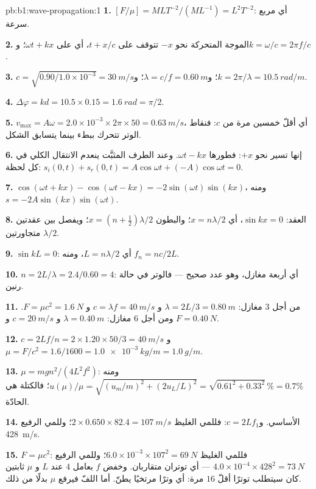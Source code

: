 \begin{solution}{pb:b1:wave-propagation:1}
\textbf{1.} $[F/\mu] = M L T^{-2}/(M L^{-1}) = L^2 T^{-2}$: أي مربع
سرعة.

\textbf{2.} الموجة المتحركة نحو $-x$ تتوقف على $t + x/c$، أي على
$\omega t + kx$؛ و$k = \omega/c = 2\pi f/c$.

\textbf{3.} $c = \sqrt{0.90/1.0\times10^{-3}} = \qty{30}{m/s}$؛
و$\lambda = c/f = \qty{0.60}{m}$؛ و$k = 2\pi/\lambda = \qty{10.5}{rad/m}$.

\textbf{4.} $\Delta\varphi = kd = 10.5 \times 0.15 = \qty{1.6}{rad} = \pi/2$.

\textbf{5.} $v_{\max} = A\omega = 2.0\times10^{-3} \times 2\pi \times 50 =
\qty{0.63}{m/s}$، أي أقلّ خمسين مرة من $c$: فنقاط الوتر تتحرك
ببطء بينما يتسابق الشكل.

\textbf{6.} إنها تسير نحو $+x$: فطورها $\omega t - kx$. وعند الطرف
المثبَّت ينعدم الانتقال الكلي في كل لحظة: $s_i(0, t) + s_r(0, t)
= A\cos\omega t + (-A)\cos\omega t = 0$.

\textbf{7.} $\cos(\omega t + kx) - \cos(\omega t - kx) =
-2\sin(\omega t)\sin(kx)$، ومنه $s = -2A\sin(kx)\sin(\omega t)$.

\textbf{8.} العقد: $\sin kx = 0$، أي $x = n\lambda/2$؛ والبطون $x = (n +
\tfrac12)\lambda/2$؛ ويفصل بين عقدتين متجاورتين $\lambda/2$.

\textbf{9.} $\sin kL = 0$: أي $L = n\lambda/2$، ومنه $f_n = nc/2L$.

\textbf{10.} $n = 2L/\lambda = 2.4/0.60 = 4$: أي أربعة مغازل، وهو عدد صحيح
--- فالوتر في حالة رنين.

\textbf{11.} من أجل $3$ مغازل: $\lambda = 2L/3 = \qty{0.80}{m}$ و $c = \lambda f
= \qty{40}{m/s}$ و $F = \mu c^2 = \qty{1.6}{N}$. ومن أجل $6$ مغازل: $\lambda =
\qty{0.40}{m}$ و $c = \qty{20}{m/s}$ و $F = \qty{0.40}{N}$.

\textbf{12.} $c = 2Lf/n = 2 \times 1.20 \times 50/3 = \qty{40}{m/s}$ و
$\mu = F/c^2 = 1.6/1600 = \qty{1.0e-3}{kg/m} = \qty{1.0}{g/m}$.

\textbf{13.} $\mu = mgn^2/(4L^2f^2)$: ومنه $u(\mu)/\mu = \sqrt{(u_m/m)^2 +
(2u_L/L)^2} = \sqrt{0.61^2 + 0.33^2}\,\% = 0.7\%$؛ فالكتلة هي الحادّة.

\textbf{14.} الأساسي. و$c = 2Lf_1$: فللمي الغليظ $2 \times 0.650 \times
82.4 = \qty{107}{m/s}$؛ وللمي الرفيع \qty{428}{m/s}.

\textbf{15.} $F = \mu c^2$: فللمي الغليظ $6.0\times10^{-3} \times 107^2 =
\qty{69}{N}$؛ وللمي الرفيع $4.0\times10^{-4} \times 428^2 = \qty{73}{N}$ ---
أي توتران متقاربان. وخفض $f$ بعامل $4$ عند $L$ و $\mu$ ثابتين
كان سيتطلب توترًا أقلّ $16$ مرة: أي وترًا مرتخيًا يطنّ. أما اللفّ
فيرفع $\mu$ بدلًا من ذلك.


\end{solution}
